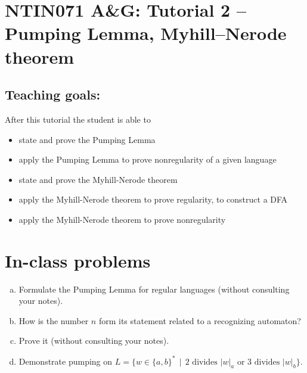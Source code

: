 \documentclass[a4paper,12pt]{amsart}
\begin{document}
\thispagestyle{empty}

\section*{NTIN071 A\&G: Tutorial 2 -- Pumping Lemma, Myhill--Nerode theorem}

\medskip

\subsection*{Teaching goals:} After this tutorial the student is able to

    \begin{itemize}\setlength{\itemsep}{0pt}
        \item state and prove the Pumping Lemma
        \item apply the Pumping Lemma to prove nonregularity of a given language
        \item state and prove the Myhill-Nerode theorem
        \item apply the Myhill-Nerode theorem to prove regularity, to construct a DFA
        \item apply the Myhill-Nerode theorem to prove nonregularity
    \end{itemize}

\section*{In-class problems}


\medskip\begin{problem}
    
    \begin{enumerate}[(a)]\setlength\itemsep{6pt}
        \item Formulate the Pumping Lemma for regular languages (without consulting your notes).
        \item How is the number $n$ form its statement related to a recognizing automaton?
        \item Prove it (without consulting your notes).
        \item Demonstrate pumping on $L=\{w\in\{a,b\}^* \,\mid\,\text{2 divides $|w|_a$ or 3 divides $|w|_b$}\}$.
    \end{enumerate}

\end{problem}
    
\end{document}
